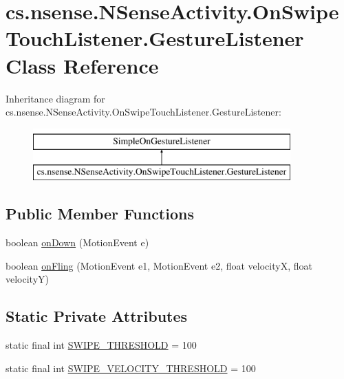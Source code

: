 \hypertarget{classcs_1_1nsense_1_1_n_sense_activity_1_1_on_swipe_touch_listener_1_1_gesture_listener}{\section{cs.\-nsense.\-N\-Sense\-Activity.\-On\-Swipe\-Touch\-Listener.\-Gesture\-Listener Class Reference}
\label{classcs_1_1nsense_1_1_n_sense_activity_1_1_on_swipe_touch_listener_1_1_gesture_listener}
}
Inheritance diagram for cs.\-nsense.\-N\-Sense\-Activity.\-On\-Swipe\-Touch\-Listener.\-Gesture\-Listener\-:\begin{figure}[H]
\begin{center}
\leavevmode
\includegraphics[height=2.000000cm]{classcs_1_1nsense_1_1_n_sense_activity_1_1_on_swipe_touch_listener_1_1_gesture_listener}
\end{center}
\end{figure}
\subsection*{Public Member Functions}
\begin{DoxyCompactItemize}
\item 
boolean \hyperlink{classcs_1_1nsense_1_1_n_sense_activity_1_1_on_swipe_touch_listener_1_1_gesture_listener_a88a776dab130e00505f9ddb8829c3b89}{on\-Down} (Motion\-Event e)
\item 
boolean \hyperlink{classcs_1_1nsense_1_1_n_sense_activity_1_1_on_swipe_touch_listener_1_1_gesture_listener_a5438d57f1d2b64f7b66bf8d562bc8767}{on\-Fling} (Motion\-Event e1, Motion\-Event e2, float velocity\-X, float velocity\-Y)
\end{DoxyCompactItemize}
\subsection*{Static Private Attributes}
\begin{DoxyCompactItemize}
\item 
static final int \hyperlink{classcs_1_1nsense_1_1_n_sense_activity_1_1_on_swipe_touch_listener_1_1_gesture_listener_acf5d02282b8ed91929a3257e327b3a12}{S\-W\-I\-P\-E\-\_\-\-T\-H\-R\-E\-S\-H\-O\-L\-D} = 100
\item 
static final int \hyperlink{classcs_1_1nsense_1_1_n_sense_activity_1_1_on_swipe_touch_listener_1_1_gesture_listener_a71ec706a71f374d6c2f40ebdbca9ed0f}{S\-W\-I\-P\-E\-\_\-\-V\-E\-L\-O\-C\-I\-T\-Y\-\_\-\-T\-H\-R\-E\-S\-H\-O\-L\-D} = 100
\end{DoxyCompactItemize}


